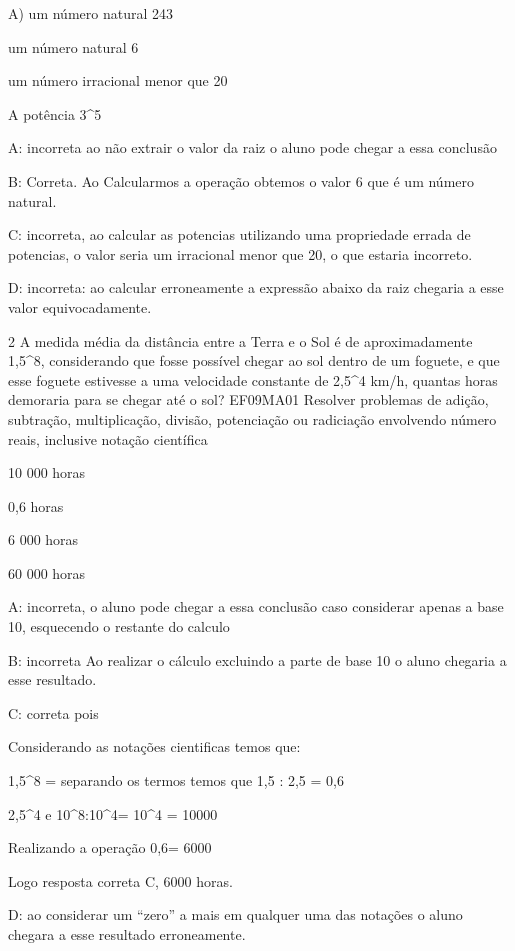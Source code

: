 A) um número natural 243

\item um número natural 6
\item um número irracional menor que 20
\item A potência 3^5

A: incorreta ao não extrair o valor da raiz o aluno pode chegar a essa
conclusão

B: Correta. Ao Calcularmos a operação obtemos o valor 6 que é um número
natural.

C: incorreta, ao calcular as potencias utilizando uma propriedade errada
de potencias, o valor seria um irracional menor que 20, o que estaria
incorreto.

D: incorreta: ao calcular erroneamente a expressão abaixo da raiz
chegaria a esse valor equivocadamente.

\num{2} A medida média da distância entre a Terra e o Sol é de
aproximadamente 1,5^8,
considerando que fosse possível chegar ao sol dentro de um foguete, e
que esse foguete estivesse a uma velocidade constante de
2,5^4 km/h, quantas horas
demoraria para se chegar até o sol? EF09MA01 Resolver problemas de
adição, subtração, multiplicação, divisão, potenciação ou radiciação
envolvendo número reais, inclusive notação científica

\item 10 000 horas
\item 0,6 horas
\item 6 000 horas
\item 60 000 horas

A: incorreta, o aluno pode chegar a essa conclusão caso considerar
apenas a base 10, esquecendo o restante do calculo

B: incorreta Ao realizar o cálculo excluindo a parte de base 10 o aluno
chegaria a esse resultado.

C: correta pois

Considerando as notações cientificas temos que:

1,5^8 = separando os termos temos
que 1,5 : 2,5 = 0,6

2,5^4 e
10^8:10^4= 10^4 =
10000

Realizando a operação 0,6= 6000

Logo resposta correta C, 6000 horas.

D: ao considerar um ``zero'' a mais em qualquer uma das notações o aluno
chegara a esse resultado erroneamente.

